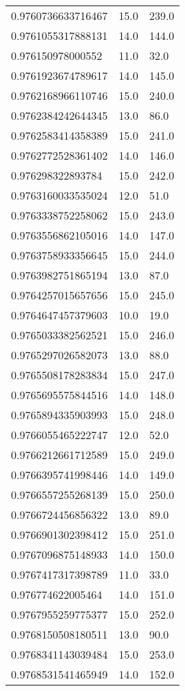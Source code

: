 \begin{center}
\begin{supertabular}[H]{p{0.30\textwidth}p{0.05\textwidth}p{0.05\textwidth}}
0.9760736633716467 & 15.0 & 239.0 \\ 
0.9761055317888131 & 14.0 & 144.0 \\ 
0.976150978000552 & 11.0 & 32.0 \\ 
0.9761923674789617 & 14.0 & 145.0 \\ 
0.9762168966110746 & 15.0 & 240.0 \\ 
0.9762384242644345 & 13.0 & 86.0 \\ 
0.9762583414358389 & 15.0 & 241.0 \\ 
0.9762772528361402 & 14.0 & 146.0 \\ 
0.976298322893784 & 15.0 & 242.0 \\ 
0.9763160033535024 & 12.0 & 51.0 \\ 
0.9763338752258062 & 15.0 & 243.0 \\ 
0.9763556862105016 & 14.0 & 147.0 \\ 
0.9763758933356645 & 15.0 & 244.0 \\ 
0.9763982751865194 & 13.0 & 87.0 \\ 
0.9764257015657656 & 15.0 & 245.0 \\ 
0.9764647457379603 & 10.0 & 19.0 \\ 
0.9765033382562521 & 15.0 & 246.0 \\ 
0.9765297026582073 & 13.0 & 88.0 \\ 
0.9765508178283834 & 15.0 & 247.0 \\ 
0.9765695575844516 & 14.0 & 148.0 \\ 
0.9765894335903993 & 15.0 & 248.0 \\ 
0.9766055465222747 & 12.0 & 52.0 \\ 
0.9766212661712589 & 15.0 & 249.0 \\ 
0.9766395741998446 & 14.0 & 149.0 \\ 
0.9766557255268139 & 15.0 & 250.0 \\ 
0.9766724456856322 & 13.0 & 89.0 \\ 
0.9766901302398412 & 15.0 & 251.0 \\ 
0.9767096875148933 & 14.0 & 150.0 \\ 
0.9767417317398789 & 11.0 & 33.0 \\ 
0.976774622005464 & 14.0 & 151.0 \\ 
0.9767955259775377 & 15.0 & 252.0 \\ 
0.9768150508180511 & 13.0 & 90.0 \\ 
0.9768341143039484 & 15.0 & 253.0 \\ 
0.9768531541465949 & 14.0 & 152.0 \\ 

\end{supertabular}
\end{center}
